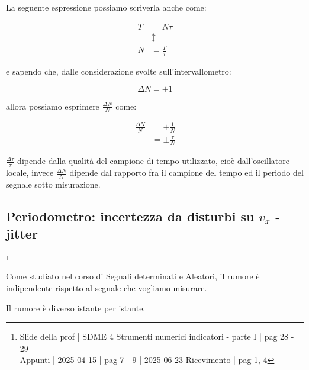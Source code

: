 La seguente espressione possiamo scriverla anche come: 

{
    \Large 
    \begin{equation}
        \begin{split}
            T &= N \tau
            \\ 
            &\updownarrow
            \\
            N &= \frac{T}{\tau}
        \end{split}
    \end{equation}
}

e sapendo che, dalle considerazione svolte sull'intervallometro: 

{
    \Large 
    \begin{equation}
        \Delta N = \pm 1
    \end{equation}
}

allora possiamo esprimere $\frac{\Delta N}{N}$ come:

{
    \Large 
    \begin{equation}
        \begin{split}
            \frac{\Delta N}{N}
            &= 
            \pm
            \frac{1}{N}
            \\ 
            &= 
            \pm 
            \frac{\tau}{N}
        \end{split}
    \end{equation}
}

$\frac{\Delta \tau}{\tau}$ dipende dalla qualità del campione di tempo utilizzato, cioè dall'oscillatore locale, 
invece $\frac{\Delta N}{N}$ dipende dal rapporto fra il campione del tempo ed il periodo del segnale sotto misurazione. \newline 

\newpage

\subsection{Periodometro: incertezza da disturbi su $v_x$ - jitter}
\footnote{Slide della prof | SDME 4 Strumenti numerici indicatori - parte I | pag 28 - 29 \\  
Appunti | 2025-04-15 | pag 7 - 9 | 2025-06-23 Ricevimento | pag 1, 4}

Come studiato nel corso di Segnali determinati e Aleatori, il rumore è indipendente rispetto al segnale che vogliamo misurare. \newline 

Il rumore è diverso istante per istante. \newline 

